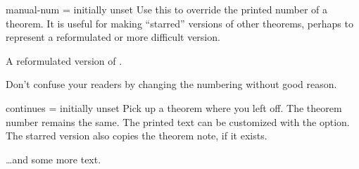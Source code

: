 \documentclass{ltxdoc}
\begin{document}
\begin{docKey}{manual-num}
  {=}
  {initially unset}
Use this to override the printed number of a theorem.
It is useful for making ``starred'' versions of other theorems, perhaps to represent a reformulated or more difficult version.

\begin{keythmscode}[]
\begin{theorem}[manual-num=\ref*{foo}*]
A reformulated version of .
\end{theorem}
\begin{theorem}[manual-num=\faRocket] %
Don't confuse your readers by changing the numbering without good reason.
\end{theorem}
\end{keythmscode}

\end{docKey}
\begin{docKey}{continues}
  {\sarg=}
  {initially unset}
Pick up a theorem where you left off.
The theorem number remains the same.
The printed text can be customized with the  option.
The starred version also copies the theorem note, if it exists.

\begin{keythmscode}[]
\begin{theorem}[continues=foo]
\dots and some more text.
\end{theorem}
\end{keythmscode}

\end{docKey}
\end{document}
